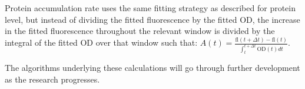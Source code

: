 \documentclass[a4page,notitlepage]{article}
\begin{document}
Protein accumulation rate uses the same fitting strategy as described for protein level, but instead of dividing the fitted fluorescence by the fitted OD, the increase in the fitted fluorescence throughout the relevant window is divided by the integral of the fitted OD over that window such that: $A(t)=\frac{\text{fl}(t+\Delta t)-\text{fl}(t)}{\int_t^{t+\Delta t}\text{OD}(t)dt}$.

The algorithms underlying these calculations will go through further development as the research progresses.
\printbibliography
\end{document}
